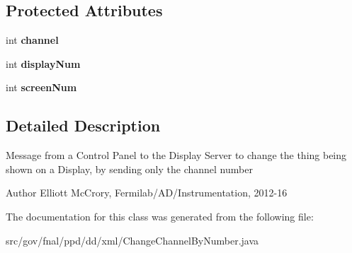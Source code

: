 \subsection*{Protected Attributes}
\begin{DoxyCompactItemize}
\item 
\hypertarget{classgov_1_1fnal_1_1ppd_1_1dd_1_1xml_1_1ChangeChannelByNumber_a90458a8b7279c5945d9753497acc4d08}{int {\bfseries channel}}\label{classgov_1_1fnal_1_1ppd_1_1dd_1_1xml_1_1ChangeChannelByNumber_a90458a8b7279c5945d9753497acc4d08}

\item 
\hypertarget{classgov_1_1fnal_1_1ppd_1_1dd_1_1xml_1_1ChangeChannelByNumber_aa2782c2fbb21c4288f25a25d8009fccd}{int {\bfseries display\-Num}}\label{classgov_1_1fnal_1_1ppd_1_1dd_1_1xml_1_1ChangeChannelByNumber_aa2782c2fbb21c4288f25a25d8009fccd}

\item 
\hypertarget{classgov_1_1fnal_1_1ppd_1_1dd_1_1xml_1_1ChangeChannelByNumber_ad4a3ad96f528e9d7283bf3415962f34a}{int {\bfseries screen\-Num}}\label{classgov_1_1fnal_1_1ppd_1_1dd_1_1xml_1_1ChangeChannelByNumber_ad4a3ad96f528e9d7283bf3415962f34a}

\end{DoxyCompactItemize}


\subsection{Detailed Description}
Message from a Control Panel to the Display Server to change the thing being shown on a Display, by sending only the channel number

\begin{DoxyAuthor}{Author}
Elliott Mc\-Crory, Fermilab/\-A\-D/\-Instrumentation, 2012-\/16 
\end{DoxyAuthor}


The documentation for this class was generated from the following file\-:\begin{DoxyCompactItemize}
\item 
src/gov/fnal/ppd/dd/xml/Change\-Channel\-By\-Number.\-java\end{DoxyCompactItemize}
